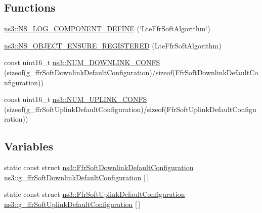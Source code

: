 \subsection*{Functions}
\begin{DoxyCompactItemize}
\item 
\hyperlink{namespacens3_a18cfbc62ef812bddb78d8882b0e00990}{ns3\+::\+N\+S\+\_\+\+L\+O\+G\+\_\+\+C\+O\+M\+P\+O\+N\+E\+N\+T\+\_\+\+D\+E\+F\+I\+NE} (\char`\"{}Lte\+Ffr\+Soft\+Algorithm\char`\"{})
\item 
\hyperlink{namespacens3_aa37b5775fcaa6f4e77a7ba57a9795404}{ns3\+::\+N\+S\+\_\+\+O\+B\+J\+E\+C\+T\+\_\+\+E\+N\+S\+U\+R\+E\+\_\+\+R\+E\+G\+I\+S\+T\+E\+R\+ED} (Lte\+Ffr\+Soft\+Algorithm)
\item 
const uint16\+\_\+t \hyperlink{namespacens3_a5d6db3fe745b6215d40b3f56fc7295bb}{ns3\+::\+N\+U\+M\+\_\+\+D\+O\+W\+N\+L\+I\+N\+K\+\_\+\+C\+O\+N\+FS} (sizeof(g\+\_\+ffr\+Soft\+Downlink\+Default\+Configuration)/sizeof(Ffr\+Soft\+Downlink\+Default\+Configuration))
\item 
const uint16\+\_\+t \hyperlink{namespacens3_a03a1da8ca99e11006c5ef91e009c1ab7}{ns3\+::\+N\+U\+M\+\_\+\+U\+P\+L\+I\+N\+K\+\_\+\+C\+O\+N\+FS} (sizeof(g\+\_\+ffr\+Soft\+Uplink\+Default\+Configuration)/sizeof(Ffr\+Soft\+Uplink\+Default\+Configuration))
\end{DoxyCompactItemize}
\subsection*{Variables}
\begin{DoxyCompactItemize}
\item 
static const struct \hyperlink{structns3_1_1FfrSoftDownlinkDefaultConfiguration}{ns3\+::\+Ffr\+Soft\+Downlink\+Default\+Configuration} \hyperlink{namespacens3_ab5144aaac6e132ba1ac31ed965720dc7}{ns3\+::g\+\_\+ffr\+Soft\+Downlink\+Default\+Configuration} \mbox{[}$\,$\mbox{]}
\item 
static const struct \hyperlink{structns3_1_1FfrSoftUplinkDefaultConfiguration}{ns3\+::\+Ffr\+Soft\+Uplink\+Default\+Configuration} \hyperlink{namespacens3_a926f853242f1132b28ce0e6e31a40c02}{ns3\+::g\+\_\+ffr\+Soft\+Uplink\+Default\+Configuration} \mbox{[}$\,$\mbox{]}
\end{DoxyCompactItemize}
